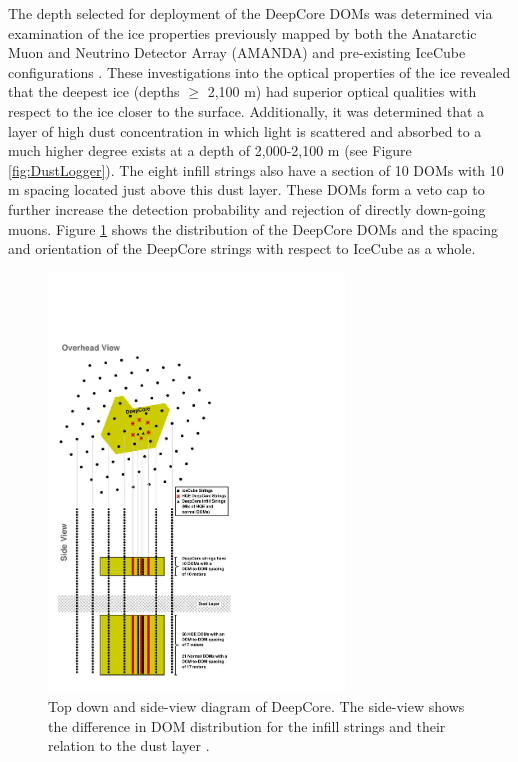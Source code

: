 \documentclass{gatech-thesis}
\begin{document}
The depth selected for deployment of the DeepCore DOMs was determined via examination of the ice properties previously mapped by both the Anatarctic Muon and Neutrino Detector Array (AMANDA) \cite{2006JGRD..11113203A} and pre-existing IceCube configurations \cite{2013JGlac..59.1117.}. These investigations into the optical properties of the ice revealed that the deepest ice (depths $\geq$ 2,100 m) had superior optical qualities with respect to the ice closer to the surface. Additionally, it was determined that a layer of high dust concentration in which light is scattered and absorbed to a much higher degree exists at a depth of 2,000-2,100 m (see Figure \ref{fig:DustLogger}). The eight infill strings also have a section of 10 DOMs with 10 m spacing located just above this dust layer. These DOMs form a veto cap to further increase the detection probability and rejection of directly down-going muons. Figure \ref{fig:DeepCoreSchematic} shows the distribution of the DeepCore DOMs and the spacing and orientation of the DeepCore strings with respect to IceCube as a whole.

\begin{figure}[ht]
  \begin{center}
    \includegraphics[width=0.7\textwidth,keepaspectratio]{IC86EDC_DeepCoreDiagram.pdf}
  \end{center}
  \caption[DeepCore Schematic]{Top down and side-view diagram of DeepCore. The side-view shows the difference in DOM distribution for the infill strings and their relation to the dust layer \cite{2012APh....35..615A}.}
  \label{fig:DeepCoreSchematic}
\end{figure}
\end{document}
